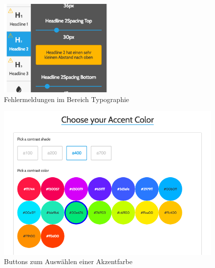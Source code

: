 \begin{figure}[h]
    \centering
    \includegraphics[width=0.5\textwidth]{images/25knots_Warning.png}
    \caption{Fehlermeldungen im Bereich Typographie}
    \label{fig:warning}
\end{figure}

\begin{figure}[h]
    \centering
    \includegraphics[width=1\textwidth]{images/25knots_color_button.png}
    \caption{Buttons zum Auswählen einer Akzentfarbe}
    \label{fig:accent}
\end{figure}


